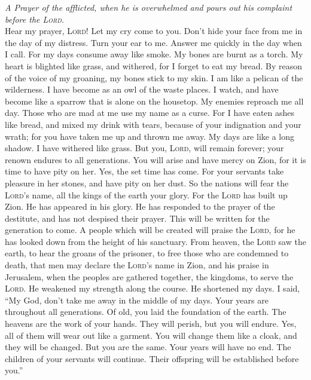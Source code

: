 \emph{A Prayer of the afflicted, when he is overwhelmed and pours out
his complaint before the \textsc{Lord}.}\\
 Hear my prayer, \textsc{Lord}! Let my cry come to you.
 Don't hide your face from me in the day of my distress.
Turn your ear to me. Answer me quickly in the day when I call.
 For my days consume away like smoke. My bones are burnt
as a torch.  My heart is blighted like grass, and
withered, for I forget to eat my bread.  By reason of the
voice of my groaning, my bones stick to my skin.  I am
like a pelican of the wilderness. I have become as an owl of the waste
places.  I watch, and have become like a sparrow that is
alone on the housetop.  My enemies reproach me all day.
Those who are mad at me use my name as a curse.  For I
have eaten ashes like bread, and mixed my drink with tears,
 because of your indignation and your wrath; for you have
taken me up and thrown me away.  My days are like a long
shadow. I have withered like grass.  But you,
\textsc{Lord}, will remain forever; your renown endures to all
generations.  You will arise and have mercy on Zion, for
it is time to have pity on her. Yes, the set time has come.
 For your servants take pleasure in her stones, and have
pity on her dust.  So the nations will fear the
\textsc{Lord}'s name, all the kings of the earth your glory.
 For the \textsc{Lord} has built up Zion. He has appeared
in his glory.  He has responded to the prayer of the
destitute, and has not despised their prayer.  This will
be written for the generation to come. A people which will be created
will praise the \textsc{Lord},  for he has looked down
from the height of his sanctuary. From heaven, the \textsc{Lord} saw the
earth,  to hear the groans of the prisoner, to free those
who are condemned to death,  that men may declare the
\textsc{Lord}'s name in Zion, and his praise in Jerusalem,
 when the peoples are gathered together, the kingdoms, to
serve the \textsc{Lord}.  He weakened my strength along
the course. He shortened my days.  I said, ``My God,
don't take me away in the middle of my days. Your years are throughout
all generations.  Of old, you laid the foundation of the
earth. The heavens are the work of your hands.  They will
perish, but you will endure. Yes, all of them will wear out like a
garment. You will change them like a cloak, and they will be changed.
 But you are the same. Your years will have no end.
 The children of your servants will continue. Their
offspring will be established before you.''

